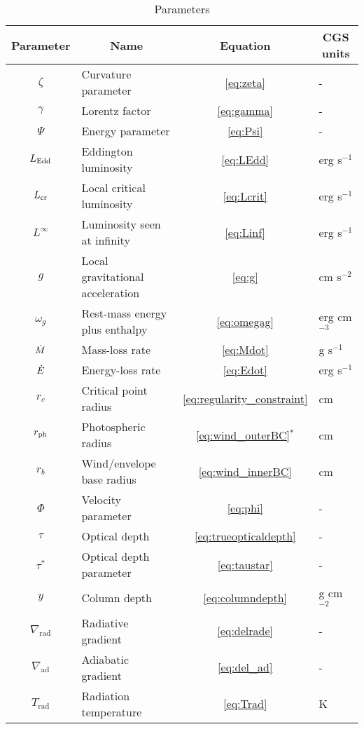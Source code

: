 \documentclass[../main.tex]{subfiles}
\begin{document}
\begin{table}[htb!]
    \centering
    \caption{Parameters}
    \begin{tabular}{clcl}
        \hline
        Parameter & \multicolumn{1}{c}{Name} & Equation & \multicolumn{1}{c}{CGS units}\\\hline
        $\zeta$ & Curvature parameter & \eqref{eq:zeta} & -\\
        $\gamma$ & Lorentz factor & \eqref{eq:gamma} & -\\
        $\Psi$ & Energy parameter & \eqref{eq:Psi} & -\\
        $L_\text{Edd}$ & Eddington luminosity & \eqref{eq:LEdd} & erg s$^{-1}$\\
        $L_\text{cr}$ & Local critical luminosity & \eqref{eq:Lcrit} & erg s$^{-1}$\\
        $L^\infty$ & Luminosity seen at infinity & \eqref{eq:Linf} & erg s$^{-1}$\\
        $g$ & Local gravitational acceleration & \eqref{eq:g} & cm s$^{-2}$\\
        $\omega_g$ & Rest-mass energy plus enthalpy & \eqref{eq:omegag} & erg cm$^{-3}$\\
        $\dot{M}$ & Mass-loss rate & \eqref{eq:Mdot} & g s$^{-1}$\\
        $\dot{E}$ & Energy-loss rate & \eqref{eq:Edot} & erg s$^{-1}$\\
        $r_c$ & Critical point radius & \eqref{eq:regularity_constraint} & cm\\
        $r_\text{ph}$ & Photospheric radius & \eqref{eq:wind_outerBC}$^*$ & cm\\
        $r_b$ & Wind/envelope base radius & \eqref{eq:wind_innerBC} & cm\\
        $\Phi$ & Velocity parameter & \eqref{eq:phi} & -\\
        $\tau$ & Optical depth & \eqref{eq:trueopticaldepth} & -\\
        $\tau^*$ & Optical depth parameter & \eqref{eq:taustar} & -\\
        $y$ & Column depth & \eqref{eq:columndepth} & g cm$^{-2}$\\
        $\nabla_\text{rad}$ & Radiative gradient & \eqref{eq:delrade} & -\\
        $\nabla_\text{ad}$ & Adiabatic gradient & \eqref{eq:del_ad} & -\\
        $T_\text{rad}$ & Radiation temperature & \eqref{eq:Trad} & K\\

\end{tabular}
\end{table}
\end{document}
